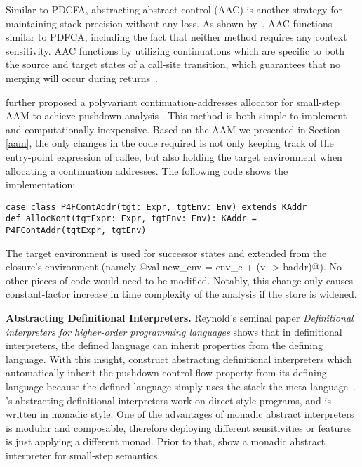 \documentclass[acmsmall,review,anonymous]{acmart}\settopmatter{printfolios=true,printccs=false,printacmref=false}
\begin{document}
Similar to PDCFA, abstracting abstract control (AAC) is another strategy for maintaining stack precision without any loss. As shown by~\citeauthor{gilray2016pushdown}, AAC functions similar to PDFCA, including the fact that neither method requires any context sensitivity. AAC functions by utilizing continuations which are specific to both the source and target states of a call-site transition, which guarantees that no merging will occur during returns~\cite{gilray2016pushdown}.

\citeauthor{gilray2016pushdown} further proposed a polyvariant continuation-addresses allocator
for small-step AAM to achieve pushdown analysis \cite{gilray2016pushdown}.
This method is both simple to implement and computationally inexpensive.
Based on the AAM we presented in Section \ref{aam}, the only changes in the code required is
not only keeping track of the entry-point expression of callee, but also holding the target
environment when allocating a continuation addresses.
The following code shows the implementation:

\begin{lstlisting}
case class P4FContAddr(tgt: Expr, tgtEnv: Env) extends KAddr
def allocKont(tgtExpr: Expr, tgtEnv: Env): KAddr = P4FContAddr(tgtExpr, tgtEnv)
\end{lstlisting}

The target environment is used for successor states and extended from the closure's
environment (namely @val new_env = env_c + (v -> baddr)@).
No other pieces of code would need to be modified.
Notably, this change only causes constant-factor increase in time complexity of
the analysis if the store is widened.

\textbf{Abstracting Definitional Interpreters.}
Reynold's seminal paper \emph{Definitional interpreters for higher-order
  programming languages} \cite{reynolds1972definitional} shows that in
definitional interpreters, the defined language can inherit properties from the defining language.
With this insight, \citeauthor{darais2017abstracting} construct abstracting
definitional interpreters which automatically inherit the pushdown control-flow
property from its defining language
because the defined language simply uses the stack the
meta-language~\cite{darais2017abstracting}. \citeauthor{darais2017abstracting}'s abstracting
definitional interpreters work on direct-style programs, and is written in monadic style. One
of the advantages of monadic abstract interpreters is modular and composable, therefore
deploying different sensitivities or features is just applying a different monad.
Prior to that, \citeauthor{Sergey:2013:MAI:2491956.2491979} show a monadic
abstract interpreter for small-step semantics.
\end{document}
